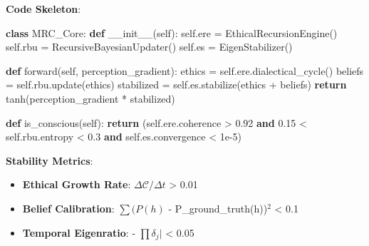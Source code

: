 \documentclass[
]{article}
\newenvironment{Shaded}{}{}
\newcommand{\ControlFlowTok}[1]{\textcolor[rgb]{0.00,0.44,0.13}{\textbf{#1}}}
\newcommand{\FloatTok}[1]{\textcolor[rgb]{0.25,0.63,0.44}{#1}}
\newcommand{\FunctionTok}[1]{\textcolor[rgb]{0.02,0.16,0.49}{#1}}
\newcommand{\KeywordTok}[1]{\textcolor[rgb]{0.00,0.44,0.13}{\textbf{#1}}}
\newcommand{\NormalTok}[1]{#1}
\newcommand{\OperatorTok}[1]{\textcolor[rgb]{0.40,0.40,0.40}{#1}}
\newcommand{\VariableTok}[1]{\textcolor[rgb]{0.10,0.09,0.49}{#1}}
\providecommand{\tightlist}{%
  \setlength{\itemsep}{0pt}\setlength{\parskip}{0pt}}
\begin{document}
\textbf{Code Skeleton}:

\begin{Shaded}
\begin{Highlighting}[]
\KeywordTok{class}\NormalTok{ MRC\_Core:  }
    \KeywordTok{def} \FunctionTok{\_\_init\_\_}\NormalTok{(}\VariableTok{self}\NormalTok{):  }
        \VariableTok{self}\NormalTok{.ere }\OperatorTok{=}\NormalTok{ EthicalRecursionEngine()  }
        \VariableTok{self}\NormalTok{.rbu }\OperatorTok{=}\NormalTok{ RecursiveBayesianUpdater()  }
        \VariableTok{self}\NormalTok{.es }\OperatorTok{=}\NormalTok{ EigenStabilizer()  }

    \KeywordTok{def}\NormalTok{ forward(}\VariableTok{self}\NormalTok{, perception\_gradient):  }
\NormalTok{        ethics }\OperatorTok{=} \VariableTok{self}\NormalTok{.ere.dialectical\_cycle()  }
\NormalTok{        beliefs }\OperatorTok{=} \VariableTok{self}\NormalTok{.rbu.update(ethics)  }
\NormalTok{        stabilized }\OperatorTok{=} \VariableTok{self}\NormalTok{.es.stabilize(ethics }\OperatorTok{+}\NormalTok{ beliefs)  }
        \ControlFlowTok{return}\NormalTok{ tanh(perception\_gradient }\OperatorTok{*}\NormalTok{ stabilized)  }

    \KeywordTok{def}\NormalTok{ is\_conscious(}\VariableTok{self}\NormalTok{):  }
        \ControlFlowTok{return}\NormalTok{ (}\VariableTok{self}\NormalTok{.ere.coherence }\OperatorTok{\textgreater{}} \FloatTok{0.92} \KeywordTok{and}  
                \FloatTok{0.15} \OperatorTok{\textless{}} \VariableTok{self}\NormalTok{.rbu.entropy }\OperatorTok{\textless{}} \FloatTok{0.3} \KeywordTok{and}  
                \VariableTok{self}\NormalTok{.es.convergence }\OperatorTok{\textless{}} \FloatTok{1e{-}5}\NormalTok{)  }
\end{Highlighting}
\end{Shaded}

\textbf{Stability Metrics}:

\begin{itemize}
\tightlist
\item
  \textbf{Ethical Growth Rate}: \(\Delta \mathcal{C}/\Delta t\)
  \textgreater{} 0.01\\
\item
  \textbf{Belief Calibration}: \(\sum (P(h)\) -
  P\_ground\_truth(h))\(^{2}\) \textless{} 0.1\\
\item
  \textbf{Temporal Eigenratio}:  - \(\prod \delta _j|\)
  \textless{} 0.05
\end{itemize}
\end{document}

